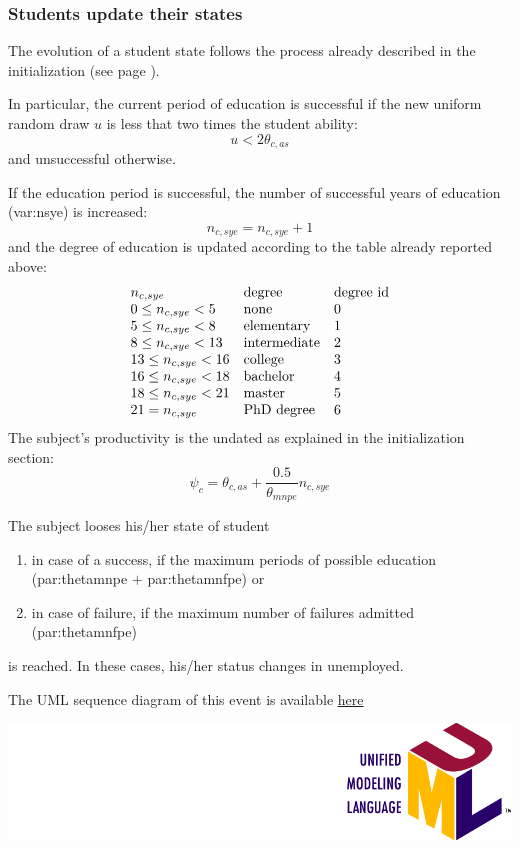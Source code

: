 \documentclass{book}
\newcommand{\doclocation}{file:///Users/giulioni/Documents/workspace/gabriele/docs}
\begin{document}
\subsubsection{Students update their states}

The evolution of a student state follows the process already described in the initialization (see page \pageref{pref:tudentevolution}).

In particular, the current period of education is successful if the new uniform random draw $u$ is less that two times the student ability:
\[
	u<2\theta_{c,as}
\]
and unsuccessful otherwise.

If the education period is successful, the number of successful years of education (\gls{var:nsye}) is increased:
\[
n_{c,sye}=n_{c,sye}+1
\]
and the degree of education is updated according to the table already reported above:
\[
	\begin{array}{l l l}
		n_{c,sye}& \textnormal{degree}& \textnormal{degree id}\\
	0\le n_{c,sye}<5 & \textnormal{none}&0\\
	5\le n_{c,sye}<8 & \textnormal{elementary}&1\\
	8\le n_{c,sye}<13 & \textnormal{intermediate}&2\\
	13\le n_{c,sye}<16 & \textnormal{college}&3\\
	16\le n_{c,sye}<18 & \textnormal{bachelor}&4\\
	18\le n_{c,sye}<21 & \textnormal{master}&5\\
	21= n_{c,sye} & \textnormal{PhD degree}&6
	\end{array}
\]
The subject's productivity is the undated as explained in the initialization section: 
\[
	\psi_c=\theta_{c,as}+\frac{0.5}{\theta_{mnpe}}n_{c,sye}
\]

The subject looses his/her state of student 
\begin{enumerate}
	\item in case of a success, if the maximum periods of possible education (\gls{par:thetamnpe} $+$ \gls{par:thetamnfpe}) or
	\item in case of failure, if the maximum number of failures admitted (\gls{par:thetamnfpe})
\end{enumerate}
is reached. In these cases, his/her status changes in unemployed.

The UML sequence diagram of this event is available \href{\doclocation/umldoc/stepStudentState.html}{here}
\begin{marginfigure}
	\includegraphics[scale=0.1]{uml.png}
\end{marginfigure}
\end{document}
